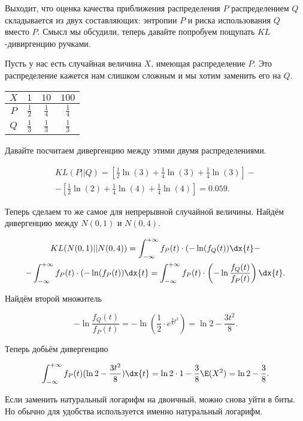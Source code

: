 Выходит, что оценка качества приближения распределения $P$ распределением $Q$ складывается из двух составляющих: энтропии $P$ и риска использования $Q$ вместо $P$. Смысл мы обсудили, теперь давайте попробуем пощупать $KL$-дивиргенцию ручками. 

Пусть у нас есть случайная величина $X$, имеющая распределение $P$. Это распределение кажется нам слишком сложным и мы хотим заменить его на $Q$. 

\begin{center}
	\begin{tabular}{c|c|c|c}
		$X$ & $1$ & $10$  &  $100$  \\ \hline
		$P$ & $\frac{1}{2}$  & $\frac{1}{4}$   &  $\frac{1}{4}$  \\ \hline 
		$Q$  &  $\frac{1}{3}$  &  $\frac{1}{3}$  &  $\frac{1}{3}$ 
	\end{tabular}
\end{center}


Давайте посчитаем дивергенцию между этими двумя распределениями. 

\begin{multline*}
KL(P || Q) = \left[ \frac{1}{2} \ln(3) + \frac{1}{4} \ln(3) + \frac{1}{4} \ln(3) \right] - \\ -\left[ \frac{1}{2} \ln(2) + \frac{1}{4} \ln(4) + \frac{1}{4} \ln(4) \right] = 0.059.
\end{multline*}

Теперь сделаем то же самое для непрерывной случайной величины. Найдём дивергенцию между $N(0,1)$ и $N(0,4)$.

\begin{multline*}
KL(N(0,1) || N(0,4)) = \int_{-\infty}^{+\infty} f_P(t) \cdot (-\ln(f_Q(t)) \dx{t} - \\ -\int_{-\infty}^{+\infty} f_P(t) \cdot (-\ln(f_P(t)) \dx{t} = \int_{-\infty}^{+\infty} f_P(t) \cdot \left( -\ln \frac{f_Q(t)}{f_P(t)} \right) \dx{t}. 
\end{multline*}

Найдём второй множитель

\[ - \ln \frac{f_Q(t)}{f_P(t)}  = -\ln \left(\frac{1}{2} \cdot e^{\tfrac{3}{8} t^2} \right) = \ln2 - \frac{3t^2}{8}.  \]

Теперь добьём дивергенцию 

\[ \int_{-\infty}^{+\infty} f_P(t) (\ln2 - \frac{3t^2}{8}) \dx{t} = \ln2 \cdot 1 - \frac{3}{8} \E(X^2) = \ln2 - \frac{3}{8}. \]

Если заменить натуральный логарифм на двоичный, можно снова уйти в биты.  Но обычно для удобства используется именно натуральный логарифм.

